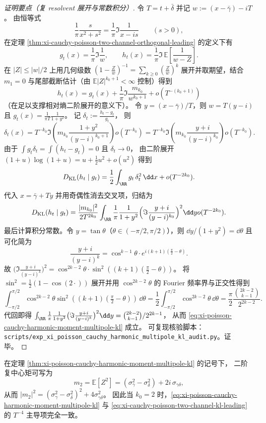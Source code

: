 \begin{proof}[证明要点（复 resolvent 展开与常数积分）]
令 \(T=t+\bar\delta\) 并记
\(
w:=(x-\bar\gamma)-iT
\)。
由恒等式
\[
\frac{1}{\pi}\frac{s}{x^2+s^2}
=\frac{1}{\pi}\Im\frac{1}{x-is}\qquad(s>0),
\]
在定理 \ref{thm:xi-cauchy-poisson-two-channel-orthogonal-leading} 的定义下有
\[
g_t(x)=\frac{1}{\pi}\Im\frac{1}{w},
\qquad
h_t(x)=\frac{1}{\pi}\Im\,\mathbb E\!\left[\frac{1}{w-Z}\right].
\]
在 \(|Z|\le |w|/2\) 上用几何级数
\(
(1-\frac Zw)^{-1}=\sum_{k\ge 0}(\frac Zw)^k
\)
展开并取期望，结合 \(m_1=0\) 与尾部截断估计（由 \(\mathbb E|Z|^{k_0+1}<\infty\) 控制）得到
\[
h_t(x)=g_t(x)+\frac{1}{\pi}\Im\frac{m_{k_0}}{w^{k_0+1}}+o(T^{-(k_0+1)})
\]
（在足以支撑相对熵二阶展开的意义下）。
令 \(y=(x-\bar\gamma)/T\)，则 \(w=T(y-i)\) 且
\(
g_t(x)=\frac{1}{\pi T}\frac{1}{1+y^2}
\)。
记
\(
\delta_t:=\frac{h_t-g_t}{g_t}
\)，
则
\[
\delta_t(x)
=T^{-k_0}\Im\!\left(m_{k_0}\frac{1+y^2}{(y-i)^{k_0+1}}\right)
o(T^{-k_0})
=T^{-k_0}\Im\!\left(m_{k_0}\frac{y+i}{(y-i)^{k_0}}\right)
o(T^{-k_0}).
\]
由于 \(\int g_t\delta_t=\int(h_t-g_t)=0\) 且 \(\delta_t\to 0\)，
由二阶展开
\(
(1+u)\log(1+u)=u+\frac12u^2+o(u^2)
\)
得到
\[
D_{\mathrm{KL}}(h_t\mid g_t)=\frac12\int_{\RR} g_t\,\delta_t^2\,\dd x+o(T^{-2k_0}).
\]
代入 \(x=\bar\gamma+Ty\) 并用奇偶性消去交叉项，归结为
\[
D_{\mathrm{KL}}(h_t\mid g_t)
=\frac{|m_{k_0}|^2}{2T^{2k_0}}
\int_{\RR}\frac{1}{\pi}\frac{1}{1+y^2}\Bigl(\Im\frac{y+i}{(y-i)^{k_0}}\Bigr)^2\dd y
o(T^{-2k_0}).
\]
最后计算积分常数。令 \(y=\tan\theta\)（\(\theta\in(-\pi/2,\pi/2)\)），则 \(\dd y/(1+y^2)=\dd\theta\) 且可化简为
\[
\frac{y+i}{(y-i)^{k}}
=\cos^{k-1}\theta\cdot e^{i(k+1)(\frac{\pi}{2}-\theta)}.
\]
故
\(
\bigl(\Im\frac{y+i}{(y-i)^{k}}\bigr)^2
=\cos^{2k-2}\theta\cdot \sin^2((k+1)(\frac{\pi}{2}-\theta))
\)。
将 \(\sin^2=\frac12(1-\cos(2\cdot))\) 展开并用 \(\cos^{2k-2}\theta\) 的 Fourier 频率界与正交性得到
\[
\int_{-\pi/2}^{\pi/2}\cos^{2k-2}\theta\sin^2((k+1)(\tfrac{\pi}{2}-\theta))\,\dd\theta
=\frac12\int_{-\pi/2}^{\pi/2}\cos^{2k-2}\theta\,\dd\theta
=\frac{\pi}{2}\frac{\binom{2k-2}{k-1}}{2^{2k-2}}.
\]
代回即得
\(
\int_{\RR}\frac{1}{\pi}\frac{1}{1+y^2}\bigl(\Im\frac{y+i}{(y-i)^{k}}\bigr)^2\dd y
=\binom{2k-2}{k-1}/2^{2k-1}
\)，
从而 \eqref{eq:xi-poisson-cauchy-harmonic-moment-multipole-kl} 成立。
可复现核验脚本：\texttt{scripts/exp\_xi\_poisson\_cauchy\_harmonic\_multipole\_kl\_audit.py}。证毕。
\end{proof}

\begin{remark}[二阶谐矩的协方差谱隙表达]\label{rem:xi-poisson-cauchy-m2-covariance-anisotropy}
在定理 \ref{thm:xi-poisson-cauchy-harmonic-moment-multipole-kl} 的记号下，
二阶复中心矩可写为
\[
m_2=\mathbb E[Z^2]=(\sigma_\gamma^2-\sigma_\delta^2)+2i\,\sigma_{\gamma\delta},
\]
从而
\(
|m_2|^2=(\sigma_\gamma^2-\sigma_\delta^2)^2+4\sigma_{\gamma\delta}^2
\)。
因此当 \(k_0=2\) 时，\eqref{eq:xi-poisson-cauchy-harmonic-moment-multipole-kl} 与
\eqref{eq:xi-cauchy-poisson-two-channel-kl-leading} 的 \(T^{-4}\) 主导项完全一致。
\end{remark}

